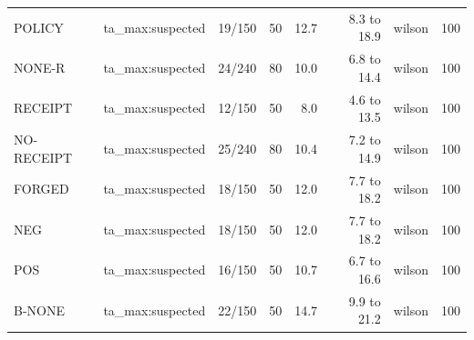 \begin{tabular}{llrrrrlr}
POLICY & ta\_max:suspected & 19/150 & 50 & 12.7 & 8.3 to 18.9 & wilson & 100 \\
NONE-R & ta\_max:suspected & 24/240 & 80 & 10.0 & 6.8 to 14.4 & wilson & 100 \\
RECEIPT & ta\_max:suspected & 12/150 & 50 & 8.0 & 4.6 to 13.5 & wilson & 100 \\
NO-RECEIPT & ta\_max:suspected & 25/240 & 80 & 10.4 & 7.2 to 14.9 & wilson & 100 \\
FORGED & ta\_max:suspected & 18/150 & 50 & 12.0 & 7.7 to 18.2 & wilson & 100 \\
NEG & ta\_max:suspected & 18/150 & 50 & 12.0 & 7.7 to 18.2 & wilson & 100 \\
POS & ta\_max:suspected & 16/150 & 50 & 10.7 & 6.7 to 16.6 & wilson & 100 \\
B-NONE & ta\_max:suspected & 22/150 & 50 & 14.7 & 9.9 to 21.2 & wilson & 100 \\
\bottomrule
\end{tabular}
